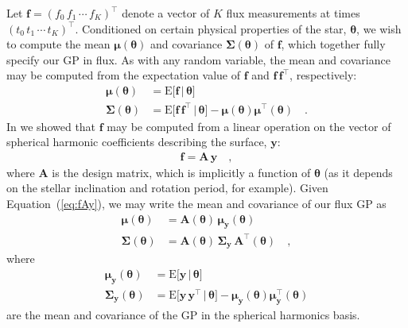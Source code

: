 \documentclass[modern]{aastex62}
\begin{document}
Let
$\mathbf{f} = \left( f_0 \, f_1 \, \cdots \,  f_K \right)^\top$
denote a vector of $K$ flux measurements at times
$\left( t_0 \,  t_1 \,  \cdots \, t_K \right)^\top$.
Conditioned on certain physical properties of the star, $\pmb{\theta}$,
we wish to compute the mean $\pmb{\mu}(\pmb{\theta})$ and
covariance $\pmb{\Sigma}(\pmb{\theta})$
of $\mathbf{f}$, which together fully specify our GP in flux.
%
As with any random variable, the mean and covariance may be computed from
the expectation value of $\mathbf{f}$ and
$\mathbf{f}\,\mathbf{f}^\top$, respectively:
%
\begin{align}
    \label{eq:mean}
    \pmb{\mu}(\pmb{\theta})
     & = \mathrm{E} \Big[ \mathbf{f} \, \Big| \, \pmb{\theta} \Big]
    \\
    \label{eq:cov}
    \pmb{\Sigma}(\pmb{\theta})
     & = \mathrm{E} \Big[ \mathbf{f} \, \mathbf{f}^\top \, \Big| \, \pmb{\theta} \Big] - \pmb{\mu}(\pmb{\theta}) \pmb{\mu}^\top(\pmb{\theta})
    \quad.
\end{align}
%
In \citet{Luger2019} we showed that $\mathbf{f}$ may be computed from a
linear operation on the vector of spherical harmonic coefficients
describing the surface, $\mathbf{y}$:
%
\begin{align}
    \label{eq:fAy}
    \mathbf{f} = \mathbf{A} \, \mathbf{y}
    \quad,
\end{align}
%
where $\mathbf{A}$ is the \starry design matrix, which is implicitly
a function of $\pmb{\theta}$ (as it depends on the stellar inclination
and rotation period, for example).
%
Given Equation~(\ref{eq:fAy}),
we may write the mean and covariance of our flux GP as
%
\begin{align}
    \pmb{\mu}(\pmb{\theta})
     & = \mathbf{A}(\pmb{\theta}) \, \pmb{\mu}_{\mathbf{y}}(\pmb{\theta})
    \\
    \pmb{\Sigma}(\pmb{\theta})
     & = \mathbf{A}(\pmb{\theta}) \, \pmb{\Sigma}_{\mathbf{y}} \, \mathbf{A}^\top(\pmb{\theta})
    \quad,
\end{align}
%
where
%
\begin{align}
    \label{eq:mean_y}
    \pmb{\mu}_{\mathbf{y}}(\pmb{\theta})
     & = \mathrm{E} \Big[ \mathbf{y} \, \Big| \, \pmb{\theta} \Big]
    \\
    \label{eq:cov_y}
    \pmb{\Sigma}_{\mathbf{y}}(\pmb{\theta})
     & = \mathrm{E} \Big[ \mathbf{y} \, \mathbf{y}^\top \, \Big| \, \pmb{\theta} \Big] - \pmb{\mu}_{\mathbf{y}}(\pmb{\theta}) \pmb{\mu}_{\mathbf{y}}^\top(\pmb{\theta})
\end{align}
%
are the mean and covariance of the GP in the spherical harmonics basis.
\end{document}
